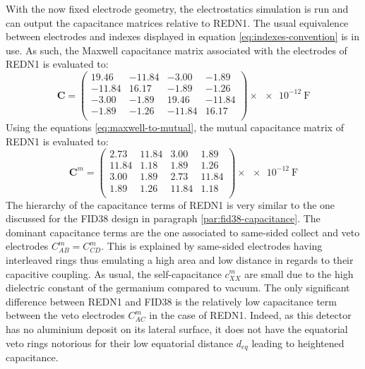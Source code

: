 With the now fixed electrode geometry, the electrostatics simulation is run and can output the capacitance matrices relative to REDN1. The usual equivalence between electrodes and indexes displayed in equation \ref{eq:indexes-convention} is in use. As such, the Maxwell capacitance matrix associated with the electrodes of REDN1 is evaluated to:
\begin{equation}
\label{eq:redn1-maxwell}
\bm{C} = 
\begin{pmatrix}
  19.46 & -11.84 & -3.00 & -1.89\\
  -11.84 & 16.17 & -1.89 & -1.26\\
  -3.00 & -1.89 & 19.46 & -11.84\\
  -1.89 & -1.26 & -11.84 & 16.17\\
\end{pmatrix}
\times \SI{e-12}{\farad}
\end{equation}
Using the equations \ref{eq:maxwell-to-mutual}, the mutual capacitance matrix of REDN1 is evaluated to:
\begin{equation}
\label{eq:redn1-mutual}
\bm{C}^m = 
\begin{pmatrix}
  2.73 & 11.84 & 3.00 & 1.89\\
  11.84 & 1.18 & 1.89 & 1.26\\
  3.00 & 1.89 & 2.73 & 11.84\\
  1.89 & 1.26 & 11.84 & 1.18\\
\end{pmatrix}
\times \SI{e-12}{\farad}
\end{equation}
The hierarchy of the capacitance terms of REDN1 is very similar to the one discussed for the FID38 design in paragraph \ref{par:fid38-capacitance}. The dominant capacitance terms are the one associated to same-sided collect and veto electrodes $C_{AB}^m=C_{CD}^m$. This is explained by same-sided electrodes having interleaved rings thus emulating a high area and low distance in regards to their capacitive coupling.
As usual, the self-capacitance $c_{XX}^m$ are small due to the high dielectric constant of the germanium compared to vacuum.
The only significant difference between REDN1 and FID38 is the relatively low capacitance term between the veto electrodes $C_{AC}^m$ in the case of REDN1. Indeed, as this detector has no aluminium deposit on its lateral surface, it does not have the equatorial veto rings notorious for their low equatorial distance $d_{eq}$ leading to heightened capacitance. 

